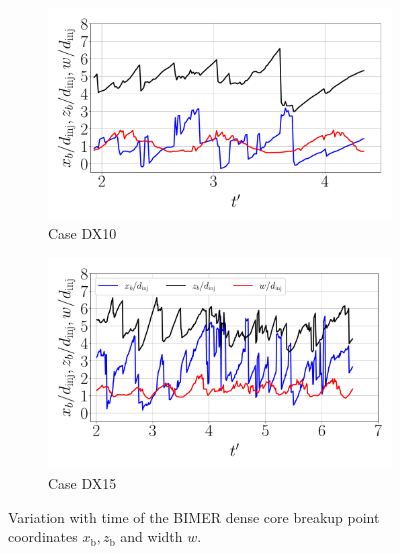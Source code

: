 \begin{figure}[ht]
\flushleft
\begin{subfigure}[b]{0.45\textwidth}
	\centering
   \includegraphics[scale=0.25]{./part3_applications/figures_ch8_resolved/results_dense_core_modeling/instant_xb_zb_w_DX10}
   \vspace*{-0.30in}
   \caption{Case DX10}
   \label{fig:instant_xb_zb_BIMER_w_DX10}
\end{subfigure}
\hfill
\begin{subfigure}[b]{0.45\textwidth}
	\centering
   \includegraphics[scale=0.25]{./part3_applications/figures_ch8_resolved/results_dense_core_modeling/instant_xb_zb_w_DX15}
   \vspace*{-0.30in}
   \caption{Case DX15}
   \label{fig:instant_xb_zb_BIMER_w_DX15} 
\end{subfigure}
   \caption{Variation with time of the BIMER dense core breakup point coordinates $x_\mathrm{b}, z_\mathrm{b}$ and width $w$.}
\label{fig:BIMER_xb_zb_w_evolution}
\end{figure}

